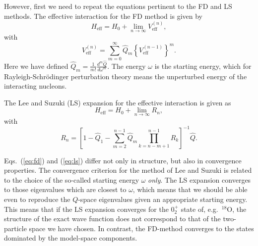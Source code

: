 However, first
we need to repeat  the equations pertinent to the FD and LS methods.
The effective interaction for the FD method is
given by
\begin{equation}
      H_{\mathrm{eff}}=H_{0}+\lim_{n \rightarrow \infty}
     V_{\mathrm{eff}}^{(n)},
\end{equation}
with
\begin{equation}
      V_{\mathrm{eff}}^{(n)}={\displaystyle\sum_{m=0}^{\infty}}
      \hat{Q}_m\left\{
      V_{\mathrm{eff}}^{(n-1)}\right\}^{m}. \label{eq:fd}
\end{equation}
Here we have defined
$\hat{Q}_{m}=\frac{1}{m!}\frac{d^{m}\hat{Q}}
{d\omega^{m}}$.
The energy $\omega$ is the starting energy, which for Rayleigh-Schr\"{o}dinger
perturbation theory means
the unperturbed energy of the interacting
nucleons. 

The Lee and Suzuki (LS)
expansion for the effective interaction is given as
\cite{ls80}
\begin{equation}
      H_{\mathrm{eff}}=H_{0}+\lim_{n \rightarrow \infty}R_{n},
      \label{eq:ls}
\end{equation}
with
\begin{equation}
     R_{n}=\left[1-\hat{Q}_{1}-\sum_{m=2}^{n-1}\hat{Q}_{m}
     \prod_{k=n-m+1}^{n-1}R_{k}\right]^{-1}\hat{Q}.
\end{equation}

Eqs.\ (\ref{eq:fd}) and (\ref{eq:ls}) differ not only in structure, but
also in convergence properties.
The convergence
criterion for the method of Lee and Suzuki is related to the
choice of the so-called starting energy
$\omega$  {\em only}.
The LS expansion converges to those eigenvalues which are
closest to $\omega$, which means that we should be able even to
reproduce the $Q$-space eigenvalues given
an appropriate starting energy.
This means that if the LS expansion converges for the $0_2^+$
state of, e.g.\ $^{18}$O,
the structure of the exact wave function
does not correspond to that of the two-particle space we have chosen.
In contrast,
the FD-method converges to the states dominated 
by the model-space components.




